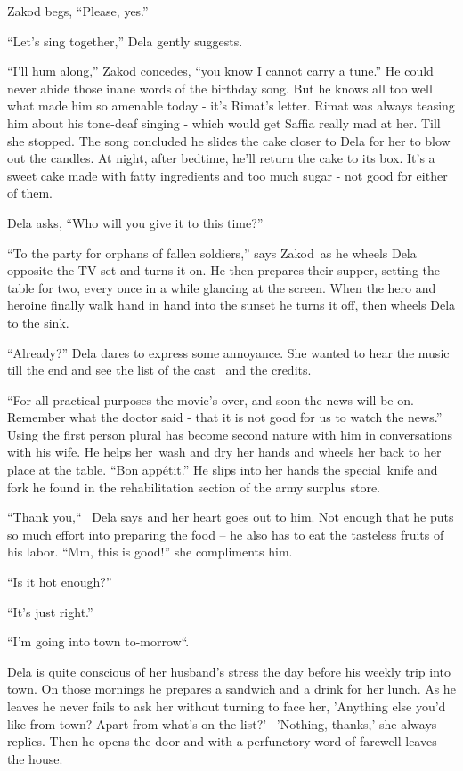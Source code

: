 \documentclass[twoside,11pt]{book}
\begin{document}
Zakod begs, ``Please, yes.''

``Let's sing together,'' Dela gently suggests.

``I'll hum along,'' Zakod concedes, ``you know I cannot carry a
tune.'' He could never abide those inane words of the birthday song. But he knows all too well what made
him so amenable today - it's Rimat's letter. Rimat was always teasing him about his tone-deaf singing - which would get
Saffia really mad at her. Till she stopped. The song concluded he slides the cake closer to Dela for her to blow out
the candles. At night, after bedtime, he'll return the cake to its box. It's a sweet cake made with fatty ingredients
and too much sugar - not good for either of them.

Dela asks, ``Who will you give it to this time?''

``To the party for orphans of fallen soldiers,'' says Zakod~as he wheels Dela opposite the TV
set and turns it on. He then prepares their supper, setting the table for two, every once in a while glancing at the
screen. When the hero and heroine finally walk hand in hand into the sunset he turns it off, then wheels Dela to the
sink.

``Already?'' Dela dares to express some annoyance. She wanted to hear the music till the end
and see the list of the cast \ and the credits.

``For all practical purposes the movie's over, and soon the news will be on. Remember what the doctor said
- that it is not good for us to watch the news.'' Using the first person plural has become second nature
with him in conversations with his wife. He helps her~wash and dry her hands and wheels her back to her place at the
table. ``Bon app\'etit.'' He slips into her hands the special~knife and fork he found in the
rehabilitation section of the army surplus store.

``Thank you,``~ Dela says and her heart goes out to him. Not enough that he puts so much
effort into preparing the food -- he also has to eat the tasteless fruits of his labor. ``Mm, this is
good!'' she compliments him.

``Is it hot enough?''

``It's just right.''

``I'm going into town to-morrow``.

Dela is quite conscious of her husband's stress the day before his weekly trip into town. On those mornings he prepares
a sandwich and a drink for her lunch. As he leaves he never fails to ask her without turning to face her, 'Anything
else you'd like from town? Apart from what's on the list?' \ {}'Nothing, thanks,' she always replies. Then he opens the
door and with a perfunctory word of farewell leaves the house.
\end{document}
